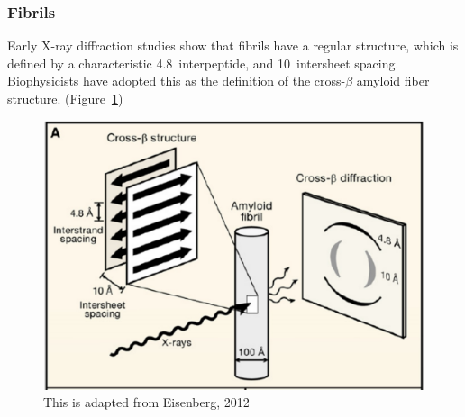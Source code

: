  \subsubsection{Fibrils}
    \label{ssub:structure}

Early X-ray diffraction studies show that fibrils have a regular structure, which is defined by a characteristic 4.8\angstrom\ interpeptide, and 10\angstrom\ intersheet spacing. Biophysicists have adopted this as the definition of the cross-$\beta$ amyloid fiber structure. (Figure~\ref{fig:fibril_diffraction})
\begin{figure}
  \centering
  \includegraphics[width=6in]{figures/introduction/fibril_structure_diffraction.pdf}
  \caption[Characteristic cross-$\beta$ spacings from X-ray fibre diffraction studies of amyloid fibrils]{This is adapted from Eisenberg, 2012}
  \label{fig:fibril_diffraction}
\end{figure}

